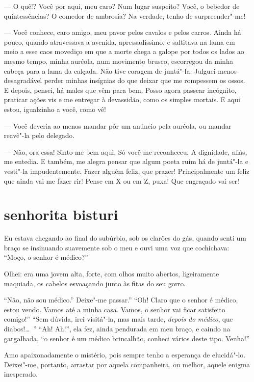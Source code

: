 --- O quê!? Você por aqui, meu caro? Num lugar suspeito?
Você, o bebedor de quintessências? O comedor de ambrosia? Na
verdade, tenho de surpreender"-me!

--- Você conhece, caro amigo, meu pavor pelos cavalos e pelos carros. Ainda
há pouco, quando atravessava a avenida, apressadíssimo, e
saltitava na lama em meio a esse caos movediço em que a morte chega a
galope por todos os lados ao mesmo tempo, minha auréola, num movimento
brusco, escorregou da minha cabeça para a lama da calçada. Não tive
coragem de juntá"-la. Julguei menos desagradável perder minhas
insígnias do que deixar que me rompessem os ossos. E depois, pensei, há
males que vêm para bem. Posso agora passear incógnito, praticar ações
vis e me entregar à devassidão, como os simples mortais. E 
aqui estou, igualzinho a você, como vê!

--- Você deveria ao menos mandar pôr um anúncio pela auréola, ou mandar
reavê"-la pelo delegado.

--- Não, ora essa! Sinto-me bem aqui. Só você me reconheceu. A dignidade, aliás, me entedia. E também, me alegra pensar que algum poeta ruim
há de juntá"-la e vesti"-la impudentemente. Fazer alguém feliz, que
prazer! Principalmente um feliz que ainda vai me fazer rir! Pense em X ou em
Z, puxa! Que engraçado vai ser!

\quebra\section[Senhorita bisturi]{senhorita bisturi}

Eu estava chegando ao final do subúrbio, sob os clarões do gás,
quando senti um braço se insinuando suavemente sob o meu e ouvi uma
voz que cochichava: “Moço, o senhor é
médico?''

Olhei: era uma jovem alta, forte, com olhos muito abertos, ligeiramente
maquiada, os cabelos esvoaçando junto às fitas do seu gorro.

“Não, não sou médico.'' Deixe"-me passar.'' “Oh! Claro que
o senhor é médico, estou vendo. Vamos até a minha casa. Vamos, o senhor vai ficar
satisfeito comigo!'' “Sem dúvida, irei visitá"-la, mas mais
tarde, \textit{depois do médico}, que diabos!\ldots\ '' “Ah! Ah!'', ela fez, ainda
pendurada em meu braço, e caindo na gargalhada, “o senhor é um médico
brincalhão, conheci vários deste tipo. Venha!''

Amo apaixonadamente o mistério, pois sempre tenho a esperança de
elucidá"-lo. Deixei"-me, portanto, arrastar por aquela companheira,
ou melhor, aquele enigma inesperado.


